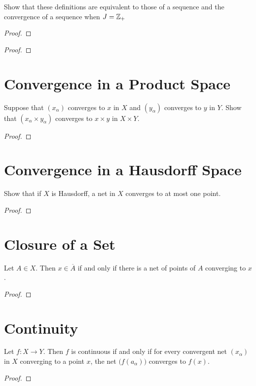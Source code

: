 \documentclass[12pt]{article}
\begin{document}
Show that these definitions are equivalent to those of a sequence and the convergence of a sequence
when $J = \mathbb{Z}_+$

\begin{proof}
\end{proof}
\begin{proof}
\end{proof}

\section{Convergence in a Product Space}
Suppose that $(x_\alpha)$ converges to $x$ in $X$ and $(y_\alpha)$ converges to $y$ in $Y$. Show
that $(x_\alpha \times y_\alpha)$ converges to $x \times y$ in $X \times Y$.
\begin{proof}
\end{proof}

\section{Convergence in a Hausdorff Space}
Show that if $X$ is Hausdorff, a net in $X$ converges to at most one point.
\begin{proof}
\end{proof}

\section{Closure of a Set}
\begin{thm}
	Let $A \in X$. Then $x \in
		\overline A$ if and only if there is a net of points of $A$ converging to $x$.
\end{thm}
\begin{proof}
\end{proof}

\section{Continuity}
\begin{thm}
	Let $f: X \to Y$. Then $f$ is continuous if and only if for every convergent net $(x_\alpha)$
	in $X$ converging to a point $x$, the net $\big(f(a_\alpha)\big)$ converges to $f(x)$.
\end{thm}
\begin{proof}
\end{proof}
\end{document}
